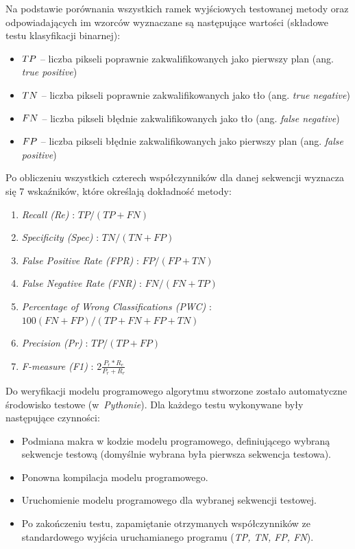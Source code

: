 \documentclass[10pt,a4paper]{article}
\begin{document}
Na podstawie porównania wszystkich ramek wyjściowych testowanej metody oraz odpowiadających im wzorców wyznaczane są następujące wartości (składowe testu klasyfikacji binarnej):
\begin{itemize}
	\item$\small TP$ -- liczba pikseli poprawnie zakwalifikowanych jako pierwszy plan (ang. \textit{true positive})
	\item $\small TN$ -- liczba pikseli poprawnie zakwalifikowanych jako tło (ang. \textit{true negative})
	\item $\small FN$ -- liczba pikseli błędnie zakwalifikowanych jako tło (ang. \textit{false negative})
	\item $\small FP$ -- liczba pikseli błędnie zakwalifikowanych jako pierwszy plan (ang. \textit{false positive})\\
\end{itemize}

\noindent Po obliczeniu wszystkich czterech współczynników dla danej sekwencji wyznacza się 7 wskaźników, które określają dokładność metody:
%
\begin{enumerate}%
	\item \textit{Recall (Re)} : \tab \small{$TP/(TP+FN)$}
	\item \textit{Specificity (Spec)} : \tab \small{$TN/(TN+FP)$}
	\item \textit{False Positive Rate (FPR)} : \tab \small{$FP/(FP + TN)$}
	\item \textit{False Negative Rate (FNR)} : \tab \small{$FN/(FN + TP)$}
	\item \textit{Percentage of Wrong Classifications (PWC)} : \tab \small{$100(FN + FP)/(TP + FN + FP + TN)$}
	\item \textit{Precision (Pr)} : \tab \small{$TP/(TP + FP)$}
	\item \textit{F-measure (F1)} : \tab \small{$2\frac{P_r*R_e}{P_r+R_r}$}\\
\end{enumerate}

Do weryfikacji modelu programowego algorytmu stworzone zostało automatyczne środowisko testowe (w~\textit{Pythonie}). Dla każdego testu wykonywane były następujące czynności:

\begin{itemize}
	\item Podmiana makra w kodzie modelu programowego, definiującego wybraną sekwencje testową (domyślnie wybrana była pierwsza sekwencja testowa).
	\item Ponowna kompilacja modelu programowego.
	\item Uruchomienie modelu programowego dla wybranej sekwencji testowej.
	\item Po zakończeniu testu, zapamiętanie otrzymanych współczynników ze standardowego wyjścia uruchamianego programu (\textit{TP, TN, FP, FN}).

\end{itemize}
\end{document}

